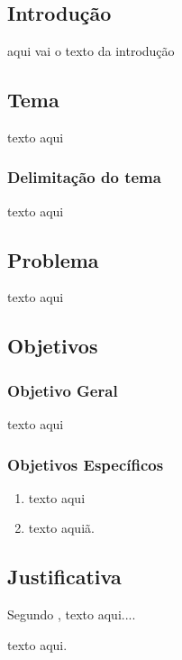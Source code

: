 \chapter*[]{}

\section{Introdução}
aqui vai o texto da introdução

\section{Tema}

texto aqui

\subsection{Delimitação do tema}

texto aqui

\section{Problema}

texto aqui


\section{Objetivos}
\subsection{Objetivo Geral}
texto aqui

\subsection{Objetivos Específicos}
\begin{enumerate}
\item texto aqui
\item texto aquiã.
\end{enumerate}

\section{Justificativa}

Segundo , texto aqui....

 texto aqui.

